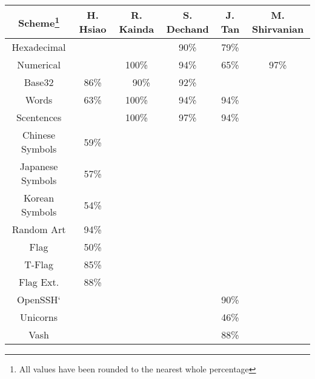 \begin{tabular}{c|ccccc}
    \toprule
    \textbf{Scheme\footnote{All values have been rounded to the nearest whole percentage}} 
    & \textbf{H. Hsiao}\cite{hsiao2009study}      
    & \textbf{R. Kainda}\cite{kainda2009usability}      
    & \textbf{S. Dechand}\cite{dechand2016empirical}
    & \textbf{J. Tan}\cite{tan2017can}      
    & \textbf{M. Shirvanian}\cite{shirvanian2017pitfalls}
    \\\hline
    Hexadecimal     &        &        & 90\% & 79\% &            \\
    Numerical       &        & 100\%  & 94\% & 65\% & 97\%       \\
    Base32          & 86\%   & ~~90\% & 92\% &      &            \\
    Words           & 63\%   & 100\%  & 94\% & 94\% &            \\
    Scentences      &        & 100\%  & 97\% & 94\% &            \\
    Chinese Symbols & 59\%   &        &      &      &            \\
    Japanese Symbols& 57\%   &        &      &      &            \\
    Korean Symbols  & 54\%   &        &      &      &            \\
    \midrule
    Random Art	     & 94\%   &&&&\\
    Flag    	     & 50\%   &&&&\\
    T-Flag  	     & 85\%   &&&&\\
    Flag Ext.	     & 88\%   &&&&\\
    OpenSSH`         &&&& 90\% &\\
    Unicorns         &&&& 46\% &\\
    Vash             &&&& 88\% &\\
    \bottomrule
\end{tabular}
